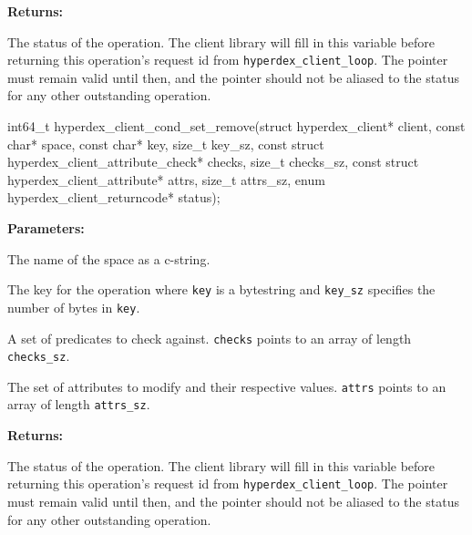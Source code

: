 \noindent\textbf{Returns:}
\begin{description}[labelindent=\widthof{{\texttt{status}}},leftmargin=*,noitemsep,nolistsep,align=right]
\item[\texttt{status}] The status of the operation.  The client library will fill in this variable before returning this operation's request id from \texttt{hyperdex\_client\_loop}.  The pointer must remain valid until then, and the pointer should not be aliased to the status for any other outstanding operation.
\end{description}

\funcsep
{}
\begin{ccode}
int64_t hyperdex_client_cond_set_remove(struct hyperdex_client* client,
                const char* space,
                const char* key, size_t key_sz,
                const struct hyperdex_client_attribute_check* checks, size_t checks_sz,
                const struct hyperdex_client_attribute* attrs, size_t attrs_sz,
                enum hyperdex_client_returncode* status);
\end{ccode}
\funcdesc 

\noindent\textbf{Parameters:}
\begin{description}[labelindent=\widthof{{\texttt{checks}, \texttt{checks\_sz}}},leftmargin=*,noitemsep,nolistsep,align=right]
\item[\texttt{space}] The name of the space as a c-string.
\item[\texttt{key}, \texttt{key\_sz}] The key for the operation where \texttt{key} is a bytestring and \texttt{key\_sz} specifies the number of bytes in \texttt{key}.
\item[\texttt{checks}, \texttt{checks\_sz}] A set of predicates to check against.  \texttt{checks} points to an array of length \texttt{checks\_sz}.
\item[\texttt{attrs}, \texttt{attrs\_sz}] The set of attributes to modify and their respective values.  \texttt{attrs} points to an array of length \texttt{attrs\_sz}.
\end{description}

\noindent\textbf{Returns:}
\begin{description}[labelindent=\widthof{{\texttt{status}}},leftmargin=*,noitemsep,nolistsep,align=right]
\item[\texttt{status}] The status of the operation.  The client library will fill in this variable before returning this operation's request id from \texttt{hyperdex\_client\_loop}.  The pointer must remain valid until then, and the pointer should not be aliased to the status for any other outstanding operation.
\end{description}

